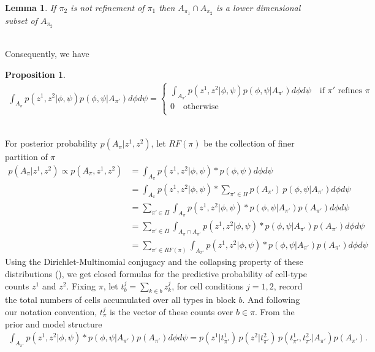 \documentclass[11pt]{amsart}
\newtheorem{lemma}{Lemma}
\newtheorem{prop}{Proposition}
\begin{document}
\begin{lemma}
If $\pi_2$ is not refinement of $\pi_1$ then $A_{\pi_1} \cap A_{\pi_2}$ is a lower dimensional subset of $A_{\pi_2}$
\end{lemma}
\hfill\\
Consequently, we have 
\begin{prop}
\begin{eqnarray*}
\int_{A_\pi} p(z^1,z^2|\phi,\psi)p(\phi,\psi | A_{\pi'})d\phi d\psi =  \left\{
              \begin{array}{ll}
                 \int_{A_{\pi'}}p(z^1,z^2|\phi,\psi)p(\phi,\psi|A_{\pi'})d\phi d\psi \quad \text{if } \pi' \text{ refines } \pi \\
                 0 \quad \text{otherwise}\\             
                \end{array}
                \right.
\end{eqnarray*}
\end{prop}
\hfill\\
For posterior probability $p(A_\pi | z^1,z^2)$, let $RF(\pi)$ be the collection of finer partition of $\pi$
\[
\begin{split}
p(A_\pi | z^1,z^2)\propto p(A_\pi, z^1,z^2) &= \int_{A_\pi} p(z^1,z^2 | \phi, \psi) * p(\phi,\psi) d\phi d\psi\\
&= \int_{A_\pi} p(z^1,z^2 | \phi, \psi) * \sum_{\pi' \in \Pi} p(A_{\pi'}) \, p(\phi,\psi| A_{\pi'} ) d\phi d\psi\\
&= \sum_{\pi' \in \Pi} \int_{A_\pi} p(z^1,z^2 | \phi, \psi) *p(\phi,\psi| A_{\pi'} )p(A_{\pi'}) d\phi d\psi\\
&= \sum_{\pi' \in \Pi} \int_{A_\pi\cap A_{\pi'}} p(z^1,z^2 | \phi, \psi) *p(\phi,\psi| A_{\pi'} )p(A_{\pi'}) d\phi d\psi\\
&= \sum_{\pi' \in RF(\pi)} \int_{A_{\pi'}}p(z^1,z^2 | \phi, \psi) * p(\phi,\psi | A_{\pi'}) p(A_{\pi'}) d\phi d\psi
\end{split}
\]
Using the Dirichlet-Multinomial conjugacy and the collapsing property of
these distributions (\cite{ref:Dickey}), we get closed formulas for the predictive
probability of cell-type counts $z^1$ and $z^2$.  Fixing $\pi$,
let $t^j_b = \sum_{k\in b} z^j_k$, for cell conditions $j=1,2$, 
record the total numbers of cells accumulated over all types in block $b$.
And following our notation convention, $t^j_\pi$ is the vector of these
counts over $b \in \pi$.  From the prior and model structure
\begin{eqnarray*}
\int_{A_{\pi'}}p(z^1,z^2 | \phi, \psi) * p(\phi,\psi | A_{\pi'}) p(A_{\pi'}) d\phi d\psi = p(z^1 | t^1_{\pi'})\, p(z^2|  t^2_{\pi'} )
 \, p( t^1_{\pi'}, t^2_{\pi'} | A_{\pi'} ) p(A_{\pi'}).
\end{eqnarray*}
\end{document}
